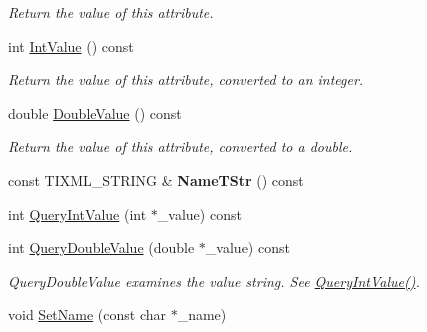 \begin{DoxyCompactItemize}
\begin{DoxyCompactList}\small\item\em Return the value of this attribute. \end{DoxyCompactList}\item 
\hypertarget{class_ti_xml_attribute_aa1a20ad59dc7e89a0ab265396360d50f}{int \hyperlink{class_ti_xml_attribute_aa1a20ad59dc7e89a0ab265396360d50f}{Int\+Value} () const }\label{class_ti_xml_attribute_aa1a20ad59dc7e89a0ab265396360d50f}

\begin{DoxyCompactList}\small\item\em Return the value of this attribute, converted to an integer. \end{DoxyCompactList}\item 
\hypertarget{class_ti_xml_attribute_a2880ddef53fc7522c99535273954d230}{double \hyperlink{class_ti_xml_attribute_a2880ddef53fc7522c99535273954d230}{Double\+Value} () const }\label{class_ti_xml_attribute_a2880ddef53fc7522c99535273954d230}

\begin{DoxyCompactList}\small\item\em Return the value of this attribute, converted to a double. \end{DoxyCompactList}\item 
\hypertarget{class_ti_xml_attribute_a64cee17bceb8232eb0736d26dd082d79}{const T\+I\+X\+M\+L\+\_\+\+S\+T\+R\+I\+N\+G \& {\bfseries Name\+T\+Str} () const }\label{class_ti_xml_attribute_a64cee17bceb8232eb0736d26dd082d79}

\item 
int \hyperlink{class_ti_xml_attribute_ad6c93088ee21af41a107931223339344}{Query\+Int\+Value} (int $\ast$\+\_\+value) const 
\item 
\hypertarget{class_ti_xml_attribute_ac87b2a8489906a5d7aa2875f20be3513}{int \hyperlink{class_ti_xml_attribute_ac87b2a8489906a5d7aa2875f20be3513}{Query\+Double\+Value} (double $\ast$\+\_\+value) const }\label{class_ti_xml_attribute_ac87b2a8489906a5d7aa2875f20be3513}

\begin{DoxyCompactList}\small\item\em Query\+Double\+Value examines the value string. See \hyperlink{class_ti_xml_attribute_ad6c93088ee21af41a107931223339344}{Query\+Int\+Value()}. \end{DoxyCompactList}\item 
\hypertarget{class_ti_xml_attribute_ab7fa3d21ff8d7c5764cf9af15b667a99}{void \hyperlink{class_ti_xml_attribute_ab7fa3d21ff8d7c5764cf9af15b667a99}{Set\+Name} (const char $\ast$\+\_\+name)}\label{class_ti_xml_attribute_ab7fa3d21ff8d7c5764cf9af15b667a99}


\end{DoxyCompactItemize}
